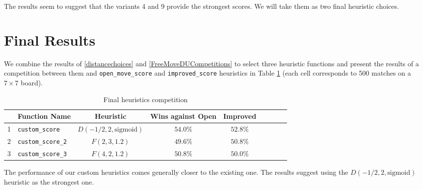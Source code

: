 \documentclass[oneside]{article}   	%
\begin{document}
The results seem to suggest that the variants 4 and 9 provide the strongest scores. We will take them as two final heuristic choices.



\section{Final Results}

We combine the results of \ref{distancechoices} and \ref{FreeMoveDUCompetitions} to select three heuristic functions and present the results of a competition between them and \texttt{open\_move\_score} and \texttt{improved\_score} heuristics in Table \ref{FinalCompetition} (each cell corresponds to 500 matches on a $7\times 7$ board).

\begin{table}[htp]
\caption{Final heuristics competition}
\begin{center}
\begin{tabular}{c|lc|cccccc}
   & Function Name & Heuristic & Wins against Open & Improved \\
   \hline
1 & \texttt{custom\_score}    & $D(-1/2, 2, \textrm{sigmoid})$ & $54.0\%$  & $52.8\%$  \\
2 & \texttt{custom\_score\_2} & $F(2, 3, 1.2)$                 & $49.6\%$  & $50.8\%$  \\
3 & \texttt{custom\_score\_3} & $F(4, 2, 1.2)$                 & $50.8\%$  & $50.0\%$  
\end{tabular}
\end{center}
\label{FinalCompetition}
\end{table}%

The performance of our custom heuristics comes generally closer to the existing one. The results suggest using the 
$D(-1/2, 2, \textrm{sigmoid})$ heuristic as the strongest one. 
\end{document}
